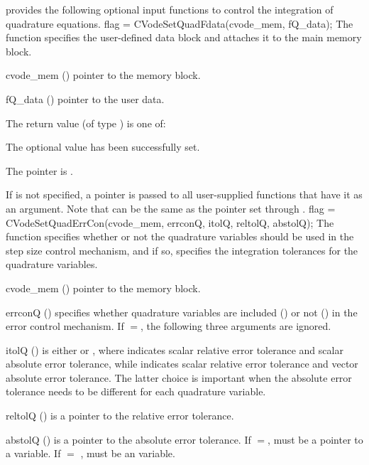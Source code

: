 {\cvodes} provides the following optional input functions to control the integration
of quadrature equations.
{
  flag = CVodeSetQuadFdata(cvode\_mem, fQ\_data);
}
{
  The function  specifies the user-defined data block 
  and attaches it to the main {\cvodes} memory block.
}
{
  \begin{args}
  \item[cvode\_mem] ()
    pointer to the {\cvodes} memory block.
  \item[fQ\_data] ()
    pointer to the user data.
  \end{args}
}
{
  The return value  (of type ) is one of:
  \begin{args}
  \item[\Id{CV\_SUCCESS}] 
    The optional value has been successfully set.
  \item[\Id{CV\_MEM\_NULL}]
    The  pointer is .
  \end{args}
}
{
  If  is not specified, a  pointer is
  passed to all user-supplied functions that have it as an argument.
  Note that  can be the same as the
  pointer  set through .
}
{
 flag = CVodeSetQuadErrCon(cvode\_mem, errconQ, itolQ, reltolQ, abstolQ);
}
{
  The function  specifies whether or not the
  quadrature variables should be used in the step size control
  mechanism, and if so, specifies the integration tolerances for the
  quadrature variables.  
}
{
  \begin{args}
  \item[cvode\_mem] ()
    pointer to the {\cvodes} memory block.
  \item[errconQ] ()
    specifies whether quadrature variables are included () or not
    () in the error control mechanism. If $=$,
    the following three arguments are ignored.
  \item[itolQ] () 
    is either  or , where  indicates 
    scalar relative error tolerance and scalar absolute error tolerance, 
    while  indicates scalar relative error tolerance and 
    vector absolute error tolerance. 
    The latter choice is important when the absolute error tolerance needs to
    be different for each quadrature variable.
  \item[reltolQ] ()
    is a pointer to the relative error tolerance.
  \item[abstolQ] ()
    is a pointer to the absolute error tolerance.  If $=$,
     must be a pointer to a  variable. If
     $=$ ,  must be an  variable.
  \item
  \end{args}
}
